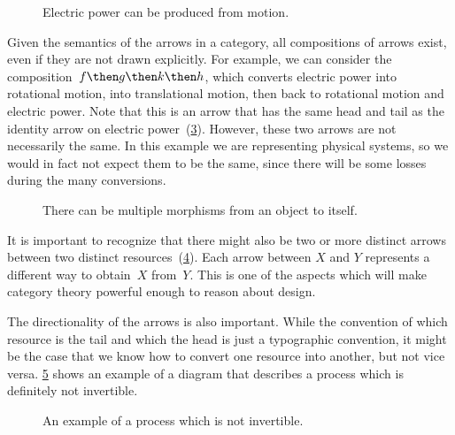 \begin{figure}[h!]
    \centering
    \caption{Electric power can be produced from motion. \label{fig:e6}}
\end{figure}


\begin{figure}[h!]
    \centering
    \caption{\label{fig:e6-together}}
\end{figure}
Given the semantics of the arrows in a category, all compositions of arrows exist, even if they are not drawn
explicitly. For example, we can consider the composition~$f\then g \then k \then h$, which
converts \textsf{electric power} into \textsf{rotational motion}, into \textsf{translational motion}, then back to
\textsf{rotational motion} and \textsf{electric power}. Note that this is an arrow that has the same head and tail as the identity arrow on \textsf{electric power}~(\cref{fig:e8}). However, these two arrows are not necessarily the same. In this example we are representing physical systems, so we would in fact not expect them to be the same, since there will be some losses during the many conversions.

\begin{figure}[h!]
    \centering
    \caption{There can be multiple morphisms from an object to itself.\label{fig:e8}}
\end{figure}

It is important to recognize that there might also be two or more distinct arrows between two distinct resources~(\cref{fig:e9}). Each arrow between $X$ and $Y$ represents a different way  to obtain~$X$ from~$Y$. This is one of the aspects which will make category theory powerful enough to reason about design.

\begin{figure}[h!]
    \centering
    \caption{\label{fig:e9}}
\end{figure}

The directionality of the arrows is also important. While the convention of
which resource is the tail and which the head is just a typographic convention,
it might be the case that we know how to convert one resource into another, but
not vice versa. \cref{fig:e10} shows an example of a diagram that describes a process which is definitely
not invertible.

\begin{figure}[h!]
    \centering
    \caption{An example of a process which is not invertible. \label{fig:e10}}
\end{figure}

